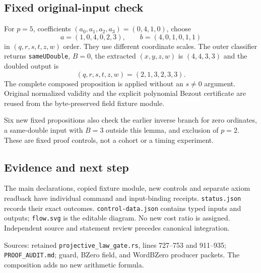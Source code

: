 \documentclass[10pt]{article}
\begin{document}
\subsection*{Fixed original-input check}
For $p=5$, coefficients $(a_0,a_1,a_2,a_3)=(0,4,1,0)$, choose
\[
a=(1,0,4,0,2,3),\qquad b=(4,0,1,0,1,1)
\]
in $(q,r,s,t,z,w)$ order. They use different coordinate scales. The outer classifier returns \texttt{sameUDouble}, $B=0$, the extracted $(x,y,z,w)$ is $(4,4,3,3)$ and the doubled output is
\[
(q,r,s,t,z,w)=(2,1,3,2,3,3).
\]
The complete composed proposition is applied without an $s\ne0$ argument. Original normalized validity and the explicit polynomial Bezout certificate are reused from the byte-preserved field fixture module.

Six new fixed propositions also check the earlier inverse branch for zero ordinates, a same-double input with $B=3$ outside this lemma, and exclusion of $p=2$. These are fixed proof controls, not a cohort or a timing experiment.
\subsection*{Evidence and next step}
The main declarations, copied fixture module, new controls and separate axiom readback have individual command and input-binding receipts. \texttt{status.json} records their exact outcomes. \texttt{control-data.json} contains typed inputs and outputs; \texttt{flow.svg} is the editable diagram. No new cost ratio is assigned. Independent source and statement review precedes canonical integration.

Sources: retained \texttt{projective\_law\_gate.rs}, lines 727--753 and 911--935; \texttt{PROOF\_AUDIT.md}; guard, BZero field, and WordBZero producer packets. The composition adds no new arithmetic formula.
\end{document}
